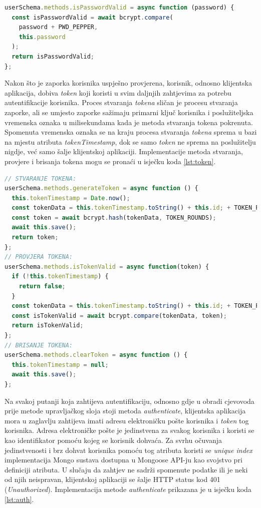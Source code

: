 \documentclass[times, utf8, diplomski, numeric]{fer}
\newcommand{\razmakp}{\vspace{18pt}}
\newcommand{\razmaks}{\vspace{10pt}}
\begin{document}
\razmakp %
\begin{lstlisting}[language=JavaScript, caption={Metoda \emph{isPasswordValid} sheme Korisnik}, label={lst:isPwd}]
userSchema.methods.isPasswordValid = async function (password) {
  const isPasswordValid = await bcrypt.compare(
    password + PWD_PEPPER,
    this.password
  );
  return isPasswordValid;
};
\end{lstlisting}
\razmaks

Nakon što je zaporka korisnika uspješno provjerena, korisnik, odnosno klijentska aplikacija, dobiva \emph{token} koji koristi u svim daljnjih zahtjevima za potrebu autentifikacije korisnika.
Proces stvaranja \emph{tokena} sličan je procesu stvaranja zaporke, ali se umjesto zaporke sažimaju primarni ključ korisnika i poslužiteljska vremenska oznaka  u milisekundama kada je metoda stvaranja tokena pokrenuta.
Spomenuta vremenska oznaka se na kraju procesa stvaranja \emph{tokena} sprema u bazi na mjestu atributa \emph{tokenTimestamp}, dok se samo \emph{token} ne sprema na poslužitelju nigdje, već samo šalje klijentskoj aplikaciji.
Implementacije metoda stvaranja, provjere i brisanja tokena mogu se pronaći u isječku koda \ref{lst:token}.

\razmakp %
\begin{lstlisting}[language=JavaScript, caption={Metode stvaranja, provjere i brisanja tokena sheme Korisnik}, label={lst:token}]
// STVARANJE TOKENA:
userSchema.methods.generateToken = async function () {
  this.tokenTimestamp = Date.now();
  const tokenData = this.tokenTimestamp.toString() + this.id; + TOKEN_PEPPER;
  const token = await bcrypt.hash(tokenData, TOKEN_ROUNDS);
  await this.save();
  return token;
};
// PROVJERA TOKENA:
userSchema.methods.isTokenValid = async function(token) {
  if (!this.tokenTimestamp) {
    return false;
  }
  const tokenData = this.tokenTimestamp.toString() + this.id; + TOKEN_PEPPER;
  const isTokenValid = await bcrypt.compare(tokenData, token);
  return isTokenValid;
};
// BRISANJE TOKENA:
userSchema.methods.clearToken = async function () {
  this.tokenTimestamp = null;
  await this.save();
};
\end{lstlisting}
\razmaks

Na svakoj putanji koja zahtijeva autentifikaciju, odnosno gdje u obradi cjevovoda prije metode upravljačkog sloja stoji metoda \emph{authenticate}, klijentska aplikacija mora u zaglavlju zahtijeva imati adresu elektroničku pošte korisnika i \emph{token} tog korisnika.
Adresa elektroničke pošte je jedinstvena za svakog korisnika i koristi se kao identifikator pomoću kojeg se korisnik dohvaća.
Za svrhu očuvanja jedinstvenosti i brz dohvat korisnika pomoću tog atributa koristi se \emph{unique index} implementacija Mongo sustava\citep{mongo} dostupna u Mongoose API-ju kao svojstvo pri definiciji atributa\citep{mongoose}.
U slučaju da zahtjev ne sadrži spomenute podatke ili je neki od njih neispravan, klijentskoj aplikaciji se šalje HTTP status kod 401 (\emph{Unauthorized}).
Implementacija metode \emph{authenticate} prikazana je u isječku koda \ref{lst:auth}.
\end{document}
